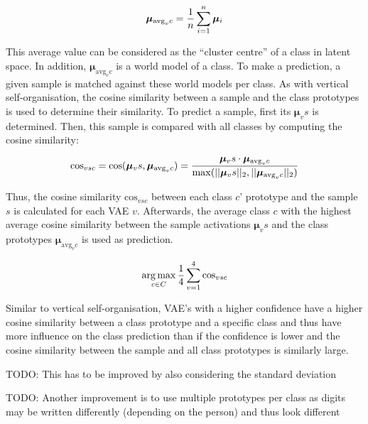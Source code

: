 \begin{equation}\eqlbl{hso_12}
		\boldsymbol{\mu}_{\text{avg}_vc} = \frac{1}{n} \sum_{i=1}^{n} \boldsymbol{\mu}_i
\end{equation}

This average value can be considered as the ``cluster centre'' of a class in latent space. In addition, $\boldsymbol{\mu}_{\text{avg}_vc}$ is a world model of a class. To make a prediction, a given sample is matched against these world models per class. As with vertical self-organisation, the cosine similarity between a sample and the class prototypes is used to determine their similarity. To predict a sample, first its $\boldsymbol{\mu}_vs$ is determined. Then, this sample is compared with all classes by computing the cosine similarity: 

\begin{equation}\eqlbl{hso_13}
		\text{cos}_{vsc} = \text{cos}(\boldsymbol{\mu}_vs, \boldsymbol{\mu}_{\text{avg}_vc}) = \frac{\boldsymbol{\mu}_vs \cdot \boldsymbol{\mu}_{\text{avg}_vc}}{\max(||\boldsymbol{\mu}_vs||_2, ||\boldsymbol{\mu}_{\text{avg}_vc}||_2)}
\end{equation}

Thus, the cosine similarity $\text{cos}_{vsc}$ between each class $c$' prototype and the sample $s$ is calculated for each VAE $v$.
Afterwards, the average class $c$ with the highest average cosine similarity between the sample activations $\boldsymbol{\mu}_vs$ and the class prototypes $\boldsymbol{\mu}_{\text{avg}_vc}$ is used as prediction.

\begin{equation}\eqlbl{hso_14}
		\argmax_{c \in C} \frac{1}{4} \sum_{v=1}^{4} \text{cos}_{vsc}
\end{equation}

Similar to vertical self-organisation, VAE's with a higher confidence have a higher cosine similarity between a class prototype and a specific class and thus have more influence on the class prediction than if the confidence is lower and the cosine similarity between the sample and all class prototypes is similarly large.

TODO: This has to be improved by also considering the standard deviation


TODO: Another improvement is to use multiple prototypes per class as digits may be written differently (depending on the person) and thus look different


